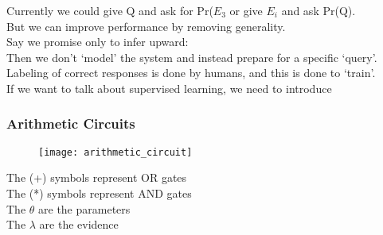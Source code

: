 \documentclass[../../lecture_notes.tex]{subfiles}
\begin{document}
\begin{center}\begin{minipage}{0.3\linewidth}
\end{minipage}%
\begin{minipage}{0.7\linewidth}
Currently we could give Q and ask for Pr($E_3$ or give $E_i$ and ask Pr(Q).\\
But we can improve performance by removing generality.\\
Say we promise only to infer upward:\\
Then we don’t ‘model’ the system and instead prepare for a specific ‘query’.\\
Labeling of correct responses is done by humans, and this is done to ‘train’.\\
If we want to talk about supervised learning, we need to introduce
\end{minipage}\end{center}

\subsubsection*{Arithmetic Circuits}

\begin{center}\begin{minipage}{0.65\linewidth}
\begin{figure}[H]
	\texttt{[image: arithmetic\_circuit]}
\end{figure}\end{minipage}%
\begin{minipage}{0.36\linewidth}
\noindent The (+) symbols represent OR gates\\
The (*) symbols represent AND gates\\
The $\theta$ are the parameters\\
The $\lambda$ are the evidence\\
\end{minipage}\end{center}
\end{document}
